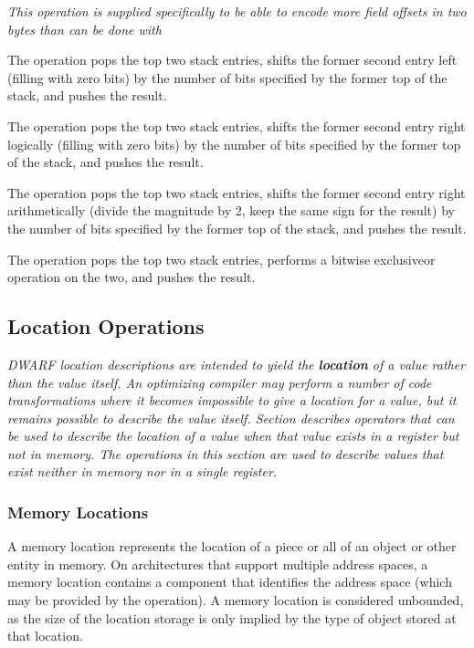 \begin{enumerate}[1. ]
\textit{This operation is supplied specifically to be
able to encode more field offsets in two bytes than can be
done with
}

\itembfnl{\DWOPshlTARG}
The \DWOPshlNAME{} operation pops the top two stack entries,
shifts the former second entry left (filling with zero bits)
by the number of bits specified by the former top of the stack,
and pushes the result.

\itembfnl{\DWOPshrTARG}
The \DWOPshrNAME{} operation pops the top two stack entries,
shifts the former second entry right logically (filling with
zero bits) by the number of bits specified by the former top
of the stack, and pushes the result.

\itembfnl{\DWOPshraTARG}
The \DWOPshraNAME{} operation pops the top two stack entries,
shifts the former second entry right arithmetically (divide
the magnitude by 2, keep the same sign for the result) by
the number of bits specified by the former top of the stack,
and pushes the result.

\itembfnl{\DWOPxorTARG}
The \DWOPxorNAME{} operation pops the top two stack entries,
performs a bitwise exclusive\dash or operation on the two, and
pushes the result.

\end{enumerate}

\subsection{Location Operations}
\label{chap:locationoperations}
\textit{DWARF location descriptions
are intended to yield the \textbf{location}
of a value rather than the value itself. An optimizing compiler
may perform a number of code transformations where it becomes
impossible to give a location for a value, but it remains possible
to describe the value itself.
Section 
describes operators that can be used to
describe the location of a value when that value exists in a
register but not in memory. The operations in this section are
used to describe values that exist neither in memory nor in a
single register.}


\subsubsection{Memory Locations}
\label{chap:memorylocations}

A  memory location
 represents the location of a piece or
all of an object or other entity in memory. On architectures that
support multiple address spaces, a memory location contains a
component that identifies the address space (which may be provided by
the \DWOPxderefNAME{} operation). A memory location is considered
unbounded, as the size of the location storage is only implied by the
type of object stored at that location.

